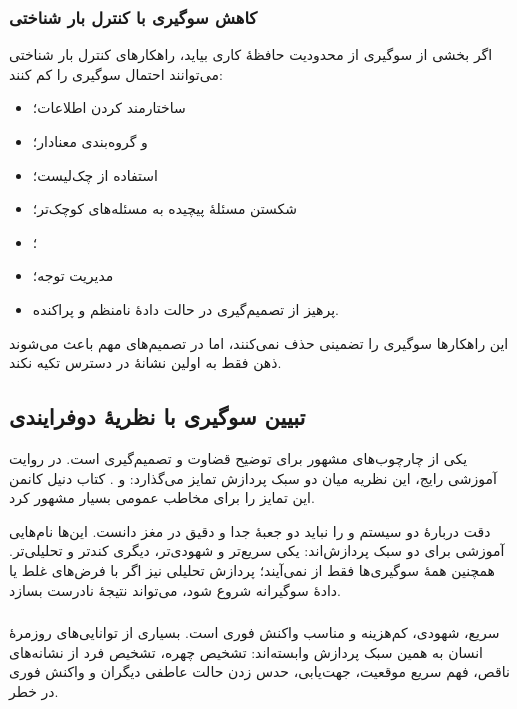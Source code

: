 \subsubsection{کاهش سوگیری با کنترل بار شناختی}
اگر بخشی از سوگیری از محدودیت حافظهٔ کاری بیاید، راهکارهای کنترل بار شناختی می‌توانند احتمال سوگیری را کم کنند:
\begin{itemize}
  \item ساختارمند کردن اطلاعات؛
  \item {} و گروه‌بندی معنادار؛
  \item استفاده از چک‌لیست؛
  \item شکستن مسئلهٔ پیچیده به مسئله‌های کوچک‌تر؛
  \item {}؛
  \item مدیریت توجه؛
  \item پرهیز از تصمیم‌گیری در حالت دادهٔ نامنظم و پراکنده.
\end{itemize}

این راهکارها سوگیری را تضمینی حذف نمی‌کنند، اما در تصمیم‌های مهم باعث می‌شوند ذهن فقط به اولین نشانهٔ در دسترس تکیه نکند.

\subsection{تبیین سوگیری با نظریهٔ دوفرایندی}
 یکی از چارچوب‌های مشهور برای توضیح قضاوت و تصمیم‌گیری است. در روایت آموزشی رایج، این نظریه میان دو سبک پردازش تمایز می‌گذارد:  و . کتاب  دنیل کانمن این تمایز را برای مخاطب عمومی بسیار مشهور کرد.

\begin{correctionbox}{دقت دربارهٔ دو سیستم}
 و  را نباید دو جعبهٔ جدا و دقیق در مغز دانست. این‌ها نام‌هایی آموزشی برای دو سبک پردازش‌اند: یکی سریع‌تر و شهودی‌تر، دیگری کندتر و تحلیلی‌تر. همچنین همهٔ سوگیری‌ها فقط از  نمی‌آیند؛ پردازش تحلیلی نیز اگر با فرض‌های غلط یا دادهٔ سوگیرانه شروع شود، می‌تواند نتیجهٔ نادرست بسازد.
\end{correctionbox}

\subsubsection{}
 سریع، شهودی، کم‌هزینه و مناسب واکنش فوری است. بسیاری از توانایی‌های روزمرهٔ انسان به همین سبک پردازش وابسته‌اند: تشخیص چهره، تشخیص فرد از نشانه‌های ناقص، فهم سریع موقعیت، جهت‌یابی، حدس زدن حالت عاطفی دیگران و واکنش فوری در خطر.

